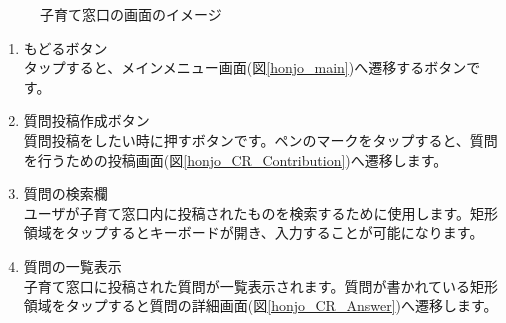\documentclass[a4j]{jarticle}
\begin{document}
\begin{figure}[H]
    \begin{center}
    \caption {子育て窓口の画面のイメージ}
    \label{honjo_CR_Window}
    \end{center}
\end{figure}

\begin{enumerate}
  \renewcommand{\labelenumi}{\textcircled{\scriptsize \theenumi}}
  \item もどるボタン\\
        タップすると、メインメニュー画面(図\ref{honjo_main})へ遷移するボタンです。
  \item 質問投稿作成ボタン\\
        質問投稿をしたい時に押すボタンです。ペンのマークをタップすると、質問を行うための投稿画面(図\ref{honjo_CR_Contribution})へ遷移します。
  \item 質問の検索欄\\
        ユーザが子育て窓口内に投稿されたものを検索するために使用します。矩形領域をタップするとキーボードが開き、入力することが可能になります。
  \item 質問の一覧表示\\
        子育て窓口に投稿された質問が一覧表示されます。質問が書かれている矩形領域をタップすると質問の詳細画面(図\ref{honjo_CR_Answer})へ遷移します。
\end{enumerate}
\end{document}
